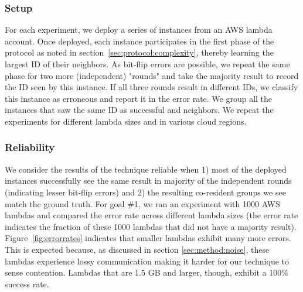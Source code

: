 \subsubsection{Setup}
\label{subsec:expsetup}
For each experiment, we deploy a series of instances from an AWS lambda
account. Once deployed, each instance participates in the first phase of the
protocol as noted in section~\ref{sec:protocol:complexity}, thereby learning the
largest ID of their neighbors. As bit-flip errors are possible, we repeat the
same phase for two more (independent) "rounds" and take the majority result to
record the ID seen by this instance.  If all three rounds result in different
IDs, we classify this instance as erroneous and report it in the error rate. We
group all the instances that saw the same ID as successful and neighbors. We
repeat the experiments for different lambda sizes and in various cloud regions.

\subsubsection{Reliability}
We consider the results of the technique reliable when 1) most of the deployed
instances successfully see the same result in majority of the independent rounds
(indicating lesser bit-flip errors) and 2) the resulting co-resident groups we
see match the ground truth.  For goal \#1, we ran an experiment with 1000 AWS
lambdas and compared the error rate across different lambda sizes (the error
rate indicates the fraction of these 1000 lambdas that did not have a majority
result). Figure~\ref{fig:errorrates} indicates that smaller lambdas exhibit many
more errors.  This is expected because, as discussed in section
\ref{sec:method:noise}, these lambdas experience lossy communication making it
harder for our technique to sense contention. Lambdas that are 1.5 GB and
larger, though, exhibit a 100\% success rate.

